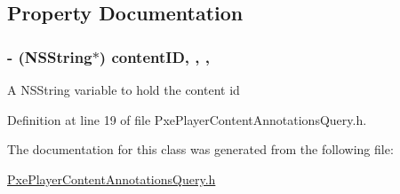 \subsection{Property Documentation}
\hypertarget{interface_pxe_player_content_annotations_query_af5d3e270914a79ec43e134e2fa6c5627}{
\subsubsection[{content\-I\-D}]{\setlength{\rightskip}{0pt plus 5cm}-\/ (N\-S\-String$\ast$) content\-I\-D\hspace{0.3cm}{\ttfamily [read]}, {\ttfamily [write]}, {\ttfamily [nonatomic]}, {\ttfamily [strong]}}}\label{interface_pxe_player_content_annotations_query_af5d3e270914a79ec43e134e2fa6c5627}
A N\-S\-String variable to hold the content id 

Definition at line 19 of file Pxe\-Player\-Content\-Annotations\-Query.\-h.



The documentation for this class was generated from the following file\-:\begin{DoxyCompactItemize}
\item 
\hyperlink{_pxe_player_content_annotations_query_8h}{Pxe\-Player\-Content\-Annotations\-Query.\-h}\end{DoxyCompactItemize}
